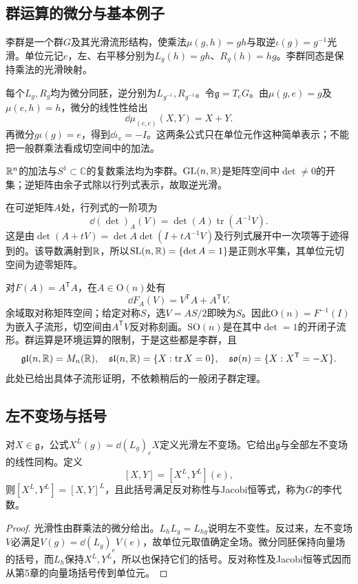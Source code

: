 \subsection{群运算的微分与基本例子}
\begin{definition}
李群是一个群$G$及其光滑流形结构，使乘法$\mu(g,h)=gh$与取逆$\iota(g)=g^{-1}$光滑。单位元记$e$，左、右平移分别为$L_g(h)=gh$、$R_g(h)=hg$。李群同态是保持乘法的光滑映射。
\end{definition}
每个$L_g,R_g$均为微分同胚，逆分别为$L_{g^{-1}},R_{g^{-1}}$。令$\mathfrak g=T_eG$。由$\mu(g,e)=g$及$\mu(e,h)=h$，微分的线性性给出
\[
 \dd\mu_{(e,e)}(X,Y)=X+Y.
\]
再微分$g\iota(g)=e$，得到$\dd\iota_e=-I$。这两条公式只在单位元作这种简单表示；不能把一般群乘法看成切空间中的加法。

\begin{example}
$\mathbb{R}^n$的加法与$S^1\subset\mathbb C$的复数乘法均为李群。$\mathrm{GL}(n,\mathbb{R})$是矩阵空间中$\det\ne0$的开集；逆矩阵由余子式除以行列式表示，故取逆光滑。

在可逆矩阵$A$处，行列式的一阶项为
\[
 \dd(\det)_A(V)=\det(A)\operatorname{tr}(A^{-1}V).
\]
这是由$\det(A+tV)=\det A\det(I+tA^{-1}V)$及行列式展开中一次项等于迹得到的。该导数满射到$\mathbb{R}$，所以$\mathrm{SL}(n,\mathbb{R})=\{\det A=1\}$是正则水平集，其单位元切空间为迹零矩阵。

对$F(A)=A^{\mathsf T}A$，在$A\in\mathrm O(n)$处有
\[
 \dd F_A(V)=V^{\mathsf T}A+A^{\mathsf T}V.
\]
余域取对称矩阵空间；给定对称$S$，选$V=AS/2$即映为$S$。因此$\mathrm O(n)=F^{-1}(I)$为嵌入子流形，切空间由$A^{\mathsf T}V$反对称刻画。$\mathrm{SO}(n)$是在其中$\det=1$的开闭子流形。群运算是环境运算的限制，于是这些都是李群，且
\[
 \mathfrak{gl}(n,\mathbb{R})=M_n(\mathbb{R}),\quad
 \mathfrak{sl}(n,\mathbb{R})=\{X:\operatorname{tr}X=0\},\quad
 \mathfrak{so}(n)=\{X:X^{\mathsf T}=-X\}.
\]
此处已给出具体子流形证明，不依赖稍后的一般闭子群定理。
\end{example}

\subsection{左不变场与括号}
\begin{proposition}\label{prop:lie-left-fields}
对$X\in\mathfrak g$，公式$X^L(g)=\dd(L_g)_eX$定义光滑左不变场。它给出$\mathfrak g$与全部左不变场的线性同构。定义
\[
 [X,Y]=[X^L,Y^L](e),
\]
则$[X^L,Y^L]=[X,Y]^L$，且此括号满足反对称性与Jacobi恒等式，称为$G$的李代数。
\end{proposition}
\begin{proof}
光滑性由群乘法的微分给出。$L_hL_g=L_{hg}$说明左不变性。反过来，左不变场$V$必满足$V(g)=\dd(L_g)_eV(e)$，故单位元取值确定全场。微分同胚保持向量场的括号，而$L_h$保持$X^L,Y^L$，所以也保持它们的括号。反对称性及Jacobi恒等式因而从第5章的向量场括号传到单位元。
\end{proof}

